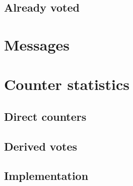 \subsection{Already voted}\label{sec9:already-voted-1}

\section{Messages}\label{sec9:messages}

\section{Counter statistics}\label{sec9:counter-statistics}

\subsection{Direct counters}\label{sec9:direct-counters}

\subsection{Derived votes}\label{sec9:derived-votes}

\subsection{Implementation}\label{sec9:implementation}

